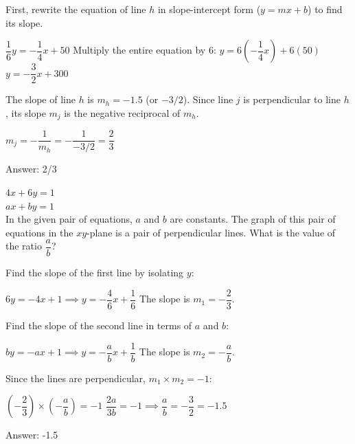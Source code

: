\documentclass[11pt,paper=a4,answers]{exam}
\begin{document}
\begin{questions}
\begin{solution}
First, rewrite the equation of line $h$ in slope-intercept form ($y = mx + b$) to find its slope.
\vspace{5pt}
\begin{center}
$\dfrac{1}{6}y = -\dfrac{1}{4}x + 50$
\vspace{5pt}
Multiply the entire equation by $6$:
\vspace{5pt}
$y = 6(-\dfrac{1}{4}x) + 6(50)$
\vspace{5pt}
$y = -\dfrac{3}{2}x + 300$
\end{center}
\vspace{5pt}
The slope of line $h$ is $m_h = -1.5$ (or $-3/2$).
\vspace{5pt}
Since line $j$ is perpendicular to line $h$, its slope $m_j$ is the negative reciprocal of $m_h$.
\vspace{5pt}
\begin{center}
$m_j = -\dfrac{1}{m_h} = -\dfrac{1}{-3/2} = \dfrac{2}{3}$
\end{center}
\vspace{5pt}
Answer: \colorbox{yellow!100}{2/3}
\end{solution}

\vspace{1cm}

\question
$4x + 6y = 1$ \\
$ax + by = 1$ \\
In the given pair of equations, $a$ and $b$ are constants. The graph of this pair of equations in the $xy$-plane is a pair of perpendicular lines. What is the value of the ratio $\dfrac{a}{b}$?

\begin{solution}
Find the slope of the first line by isolating $y$:
\vspace{5pt}
\begin{center}
$6y = -4x + 1 \implies y = -\dfrac{4}{6}x + \dfrac{1}{6}$
\vspace{5pt}
The slope is $m_1 = -\dfrac{2}{3}$.
\end{center}
\vspace{5pt}
Find the slope of the second line in terms of $a$ and $b$:
\vspace{5pt}
\begin{center}
$by = -ax + 1 \implies y = -\dfrac{a}{b}x + \dfrac{1}{b}$
\vspace{5pt}
The slope is $m_2 = -\dfrac{a}{b}$.
\end{center}
\vspace{5pt}
Since the lines are perpendicular, $m_1 \times m_2 = -1$:
\vspace{5pt}
\begin{center}
$(-\dfrac{2}{3}) \times (-\dfrac{a}{b}) = -1$
\vspace{5pt}
$\dfrac{2a}{3b} = -1 \implies \dfrac{a}{b} = -\dfrac{3}{2} = -1.5$
\end{center}
\vspace{5pt}
Answer: \colorbox{yellow!100}{-1.5}
\end{solution}


\end{questions}
\end{document}
